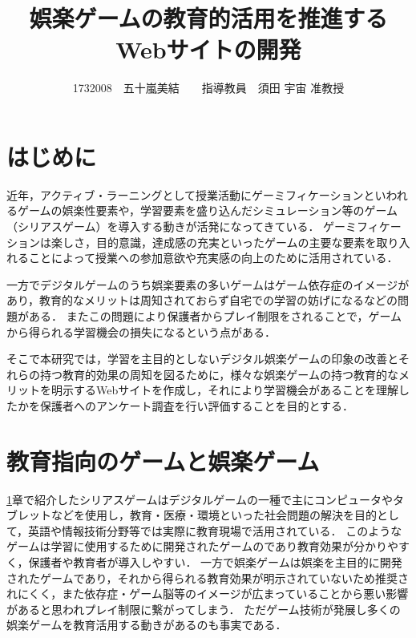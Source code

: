 \documentclass[twocolumn,10pt,a4j]{ltjsarticle}
\title{娯楽ゲームの教育的活用を推進するWebサイトの開発}
\author{1732008　五十嵐美結　　指導教員　須田 宇宙 准教授}
\date{}
\begin{document}
\maketitle

\section{はじめに}\label{introduction}


近年，アクティブ・ラーニングとして授業活動にゲーミフィケーションといわれるゲームの娯楽性要素や，学習要素を盛り込んだシミュレーション等のゲーム（シリアスゲーム）を導入する動きが活発になってきている．
ゲーミフィケーションは楽しさ，目的意識，達成感の充実といったゲームの主要な要素を取り入れることによって授業への参加意欲や充実感の向上のために活用されている．


一方でデジタルゲームのうち娯楽要素の多いゲームはゲーム依存症のイメージがあり，教育的なメリットは周知されておらず自宅での学習の妨げになるなどの問題がある．
またこの問題により保護者からプレイ制限をされることで，ゲームから得られる学習機会の損失になるという点がある．

そこで本研究では，学習を主目的としないデジタル娯楽ゲームの印象の改善とそれらの持つ教育的効果の周知を図るために，様々な娯楽ゲームの持つ教育的なメリットを明示するWebサイトを作成し，それにより学習機会があることを理解したかを保護者へのアンケート調査を行い評価することを目的とする．

\section{教育指向のゲームと娯楽ゲーム}

\ref{introduction}章で紹介したシリアスゲームはデジタルゲームの一種で主にコンピュータやタブレットなどを使用し，教育・医療・環境といった社会問題の解決を目的として，英語や情報技術分野等では実際に教育現場で活用されている．
このようなゲームは学習に使用するために開発されたゲームのであり教育効果が分かりやすく，保護者や教育者が導入しやすい．
一方で娯楽ゲームは娯楽を主目的に開発されたゲームであり，それから得られる教育効果が明示されていないため推奨されにくく，また依存症・ゲーム脳等のイメージが広まっていることから悪い影響があると思われプレイ制限に繋がってしまう．
ただゲーム技術が発展し多くの娯楽ゲームを教育活用する動きがあるのも事実である．\cite{tvgame}
\end{document}
